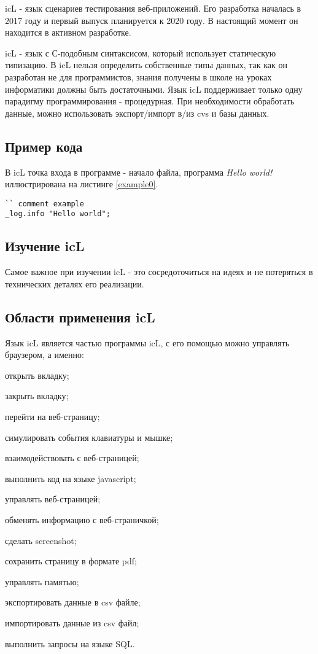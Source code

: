 \documentclass[a4paper, 14pt]{extarticle}
\begin{document}
	icL - язык сценариев тестирования веб-приложений. Его разработка началась в 2017 году и первый выпуск планируется к 2020 году. В настоящий момент он находится в активном разработке.
	
	icL - язык с С-подобным синтаксисом, который использует статическую типизацию. В icL нельзя определить собственные типы данных, так как он разработан не для программистов, знания получены в школе на уроках информатики должны быть достаточными. Язык icL поддерживает только одну парадигму программирования - процедурная. При необходимости обработать данные, можно использовать экспорт/импорт в/из cvs и базы данных.
	
	\subsection{Пример кода}

	В icL точка входа в программе - начало файла, программа \textit{Hello world!} иллюстрирована на листинге \ref{example0}.
	
	\begin{lstlisting}[caption=Пример, label=example0]
`` comment example
_log.info "Hello world";
	\end{lstlisting}
  
	\subsection{Изучение icL}
	
	Самое важное при изучении icL - это сосредоточиться на идеях и не потеряться в технических деталях его реализации.
	
	\subsection{Области применения icL}
	
	Язык icL является частью программы icL, с его помощью
	можно управлять браузером, а именно:
	\begin{list}{•}{}
	\item открыть вкладку;
	\item закрыть вкладку;
	\item перейти на веб-страницу;
	\item симулировать события клавиатуры и мышке;
	\item взаимодействовать с веб-страницей;
	\item выполнить код на языке javascript;
	\item управлять веб-страницей;
	\item обменять информацию с веб-страничкой;
	\item сделать screenshot;
	\item сохранить страницу в формате pdf;
	\item управлять памятью;
	\item экспортировать данные в csv файле;
	\item импортировать данные из csv файл;
	\item выполнить запросы на языке SQL.
	\end{list}
	
\end{document}
